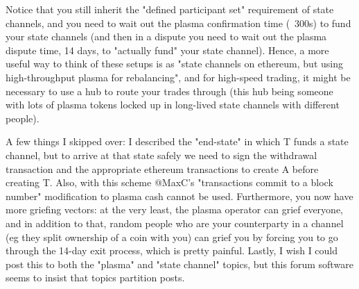 \documentclass{article}
\begin{document}
Notice that you still inherit the "defined participant set" requirement of state channels, and you need to wait out the plasma confirmation time (~300s) to fund your state channels (and then in a dispute you need to wait out the plasma dispute time, 14 days, to "actually fund" your state channel). Hence, a more useful way to think of these setups is as "state channels on ethereum, but using high-throughput plasma for rebalancing", and for high-speed trading, it might be necessary to use a hub to route your trades through (this hub being someone with lots of plasma tokens locked up in long-lived state channels with different people).

A few things I skipped over: I described the "end-state" in which T funds a state channel, but to arrive at that state safely we need to sign the withdrawal transaction and the appropriate ethereum transactions to create A before creating T. Also, with this scheme @MaxC's "transactions commit to a block number" modification to plasma cash cannot be used. Furthermore, you now have more griefing vectors: at the very least, the plasma operator can grief everyone, and in addition to that, random people who are your counterparty in a channel (eg they split ownership of a coin with you) can grief you by forcing you to go through the 14-day exit process, which is pretty painful. Lastly, I wish I could post this to both the "plasma" and "state channel" topics, but this forum software seems to insist that topics partition posts.
\end{document}
